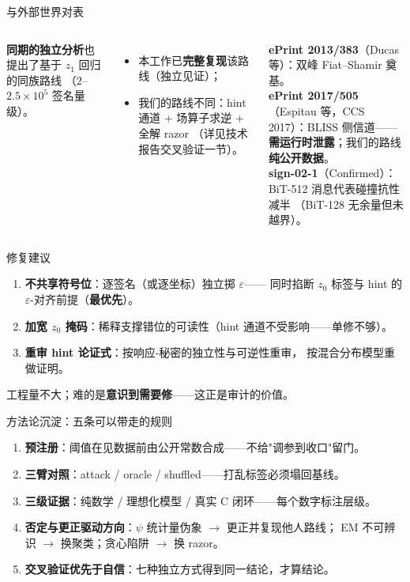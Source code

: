 \documentclass[11pt,aspectratio=169]{ctexbeamer}
\begin{document}
\begin{frame}{与外部世界对表}
  \begin{columns}[T]
    \small
    \textbf{同期的独立分析}也提出了基于 $z_1$ 回归的同族路线
    （$2$--$2.5\times10^5$ 签名量级）。
    \begin{itemize}
      \item 本工作已\textbf{完整复现}该路线（独立见证）；
      \item 我们的路线不同：hint 通道 + 场算子求逆 + 全解 razor
            （详见技术报告交叉验证一节）。
    \end{itemize}
    \small
    \textbf{ePrint 2013/383}（Ducas 等）：双峰 Fiat--Shamir 奠基。\\[0.2em]
    \textbf{ePrint 2017/505}（Espitau 等，CCS 2017）：BLISS 侧信道——
    \textbf{需运行时泄露}；我们的路线\textbf{纯公开数据}。\\[0.2em]
    \textbf{sign-02-1}（Confirmed）：BiT-512 消息代表碰撞抗性减半
    （BiT-128 无余量但未越界）。
  \end{columns}
\end{frame}

\begin{frame}{修复建议}
  \begin{enumerate}
    \item \textbf{不共享符号位}：逐签名（或逐坐标）独立掷 $\varepsilon$——
          同时掐断 $z_0$ 标签与 hint 的 $\varepsilon$-对齐前提（\textbf{最优先}）。
    \item \textbf{加宽 $z_0$ 掩码}：稀释支撑错位的可读性（hint 通道不受影响——单修不够）。
    \item \textbf{重审 hint 论证式}：按响应-秘密的独立性与可逆性重审，
          按混合分布模型重做证明。
  \end{enumerate}
  \begin{center}
    \small 工程量不大；难的是\textbf{意识到需要修}——这正是审计的价值。
  \end{center}
\end{frame}

\begin{frame}{方法论沉淀：五条可以带走的规则}
  \begin{enumerate}
    \item \textbf{预注册}：阈值在见数据前由公开常数合成——不给"调参到收口"留门。
    \item \textbf{三臂对照}：attack / oracle / shuffled——打乱标签必须塌回基线。
    \item \textbf{三级证据}：纯数学 / 理想化模型 / 真实 C 闭环——每个数字标注层级。
    \item \textbf{否定与更正驱动方向}：$\psi$ 统计量伪象 $\to$ 更正并复现他人路线；
          EM 不可辨识 $\to$ 换聚类；贪心陷阱 $\to$ 换 razor。
    \item \textbf{交叉验证优先于自信}：七种独立方式得到同一结论，才算结论。
  \end{enumerate}
\end{frame}
\end{document}
